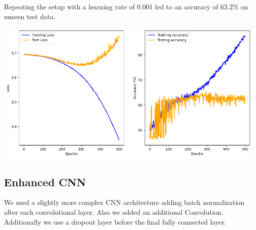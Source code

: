 Repeating the setup with a learning rate of 0.001 led to an accuracy of 63.2\%
on unseen test data.

\includegraphics*[width=\textwidth]{Figures/CNN_classifier_lr_001_charts.png}

\subsection*{Enhanced CNN}

We used a slightly more complex CNN architecture adding batch normalization
after each convolutional layer. Also we added an additional Convolution.
Additionally we use a dropout layer before the final fully connected layer.

